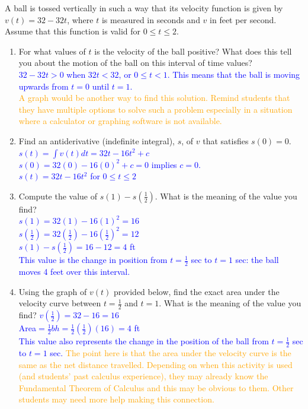 \documentclass{ximera}
\begin{document}
    
  \begin{exercise}
    A ball is tossed vertically in such a way that its velocity function is given by $v(t)=32-32t$, where $t$ is measured in seconds and $v$ in feet per second. Assume that this function is valid for $0\leq t\leq2$.
    \begin{enumerate}
        \item[A.] For what values of $t$ is the velocity of the ball positive?  What does this tell you about the motion of the ball on this interval of time values?\\
        \textcolor{blue}{ $32-32t>0$ when $32t<32$, or $0\leq t<1$.  This means that the ball is moving upwards from $t=0$ until $t=1$.}\\
        \textcolor{orange}{ A graph would be another way to find this solution.  Remind students that they have multiple options to solve such a problem especially in a situation where a calculator or graphing software is not available.}
        
        \item[B.] Find an antiderivative (indefinite integral), $s$, of $v$ that satisfies $s(0)=0$.\\
        \textcolor{blue}{ $s(t)=\int v(t)dt=32t-16t^2+c$\\
        $s(0)=32(0)-16(0)^2+c=0$ implies $c=0$.\\
        $s(t)=32t-16t^2$ for $0\leq t\leq2$}\\
        
        \item[C.] Compute the value of $s(1)-s(\frac12)$.  What is the meaning of the value you find?\\
        \textcolor{blue}{ $s(1)=32(1)-16(1)^2=16$\\
        $s(\frac12)=32(\frac12)-16(\frac12)^2=12$\\
        $s(1)-s(\frac12)=16-12=4$ ft\\
        This value is the change in position from $t=\frac12$ sec to $t=1$ sec: the ball moves 4 feet over this interval.}
        \item[D.] Using the graph of $v(t)$ provided below, find the exact area under the velocity curve between $t=\frac12$ and $t=1$.  What is the meaning of the value you find? 
        \textcolor{blue}{ $v(\frac{1}{2})=32-16=16$\\
        Area$=\frac12bh=\frac12(\frac12)(16)=4$ ft\\
        This value also represents the change in the position of the ball from $t=\frac12$ sec to $t=1$ sec.}
        \textcolor{orange}{ The point here is that the area under the velocity curve is the same as the net distance travelled.  Depending on when this activity is used (and students' past calculus experience), they may already know the Fundamental Theorem of Calculus and this may be obvious to them. Other students may need more help making this connection.}
        

\end{enumerate}
\end{exercise}
\end{document}
